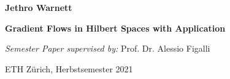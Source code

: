 \begin{titlepage}
	\begin{center}
		\vspace*{1cm}
		
		\large
		\textbf{Jethro Warnett}
		
		\vspace{1.5cm}
		
		\Huge{\textbf{Gradient Flows in Hilbert Spaces with Application}}
		
		\vfill
		
		\large
		\textit{Semester Paper supervised by:} Prof. Dr. Alessio Figalli
		
		\vspace{0.8cm}
		
		ETH Zürich, Herbstsemester 2021
	\end{center}
\end{titlepage}
